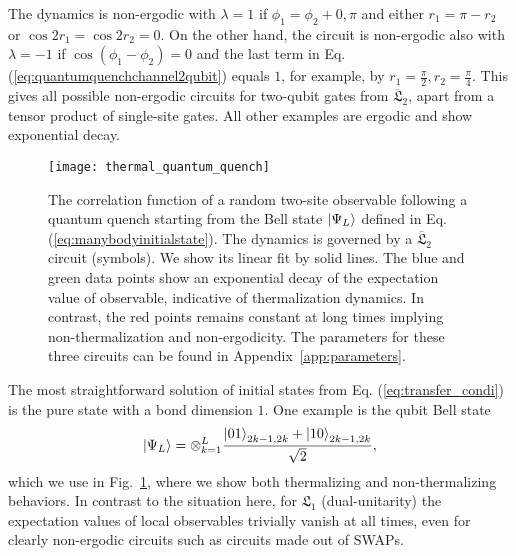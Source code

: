 \documentclass[aps,prx,twocolumn,notitlepage,nofootinbib,nobalancelastpage]{revtex4-2}
\theoremstyle{break}
\newcommand{\1}{\mathbbm{1}}
\theoremstyle{plain}
\theoremstyle{plain}
\theoremstyle{plain}
\begin{document}
The dynamics is non-ergodic with $\lambda=1$ if $\phi_1=\phi_2+0,\pi$ and either $r_1=\pi-r_2$ or $\cos{2r_1}=\cos{2r_2}=0$. On the other hand, the circuit is non-ergodic also with $\lambda=-1$ if $\cos(\phi_1-\phi_2)=0$ and the last term in Eq. (\ref{eq:quantumquenchchannel2qubit}) equals $1$, for example, by $r_1=\frac{\pi}{2},r_2=\frac{\pi}{4}$. This gives all possible non-ergodic circuits for two-qubit gates from $\overline{\mathfrak{L}}_2$, apart from a tensor product of single-site gates. All other examples are ergodic and show exponential decay.

\begin{figure}
\texttt{[image: thermal\_quantum\_quench]}

\caption{The correlation function of a random two-site observable following a quantum quench starting from the Bell state $\ket{\Psi_L}$ defined in Eq. (\ref{eq:manybodyinitialstate}). The dynamics is governed by a $\overline{\mathfrak{L}}_2$ circuit (symbols). We show its linear fit by solid lines.
The blue and green data points show an exponential decay of the expectation value of observable, indicative of thermalization dynamics. In contrast, the red points remains constant at long times implying non-thermalization and non-ergodicity. The parameters for these three circuits can be found in Appendix~\ref{app:parameters}.
}
\label{quench_correlation}
\end{figure}

The most straightforward solution of initial states from Eq. (\ref{eq:transfer_condi}) is the pure state with a bond dimension $1$. One example is the qubit Bell state
\begin{equation}
\ket{\Psi_L}=\otimes_{k=1}^L\frac{\ket{01}_{2k-1,2k}+\ket{10}_{2k-1,2k}}{\sqrt{2}},
\label{eq:manybodyinitialstate}
\end{equation}
which we use in Fig.~\ref{quench_correlation}, where we show both thermalizing and non-thermalizing behaviors.
In contrast to the situation here, for $\mathfrak{L}_1$ (dual-unitarity) the expectation values of local observables trivially vanish at all times, even for clearly non-ergodic circuits such as circuits made out of SWAPs.
%
\end{document}
